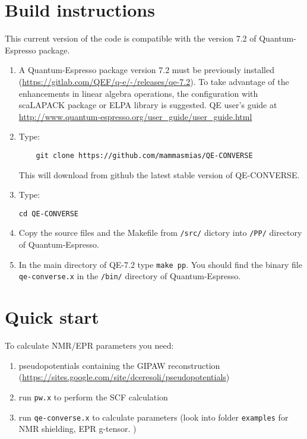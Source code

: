 \documentclass[a4paper,11pt,twoside]{article}
\begin{document}
\section{Build instructions}
This current version of the code is compatible with the version 7.2 of Quantum-Espresso package.
\begin{enumerate}
\item A Quantum-Espresso package version 7.2 must be previously installed (\url{https://gitlab.com/QEF/q-e/-/releases/qe-7.2}). To take advantage of the enhancements in linear algebra operations, the configuration with scaLAPACK package or ELPA library is suggested.
QE user's guide at \url{http://www.quantum-espresso.org/user_guide/user_guide.html}
\item Type:
\begin{verbatim}
    git clone https://github.com/mammasmias/QE-CONVERSE 
\end{verbatim}
This will download from github the latest stable version of QE-CONVERSE.
\item Type:
\begin{verbatim}
cd QE-CONVERSE
\end{verbatim}
\item 
 Copy the source files and the Makefile from \texttt{/src/} dictory into \texttt{/PP/} directory of Quantum-Espresso.
\item
 In the main directory of QE-7.2 type \texttt{make pp}. You should find the binary file \texttt{qe-converse.x} in the \texttt{/bin/} directory of Quantum-Espresso.
\end{enumerate}
\section{Quick start}
To calculate NMR/EPR parameters you need: 
\begin{enumerate}
\item pseudopotentials containing the GIPAW reconstruction (\url{https://sites.google.com/site/dceresoli/pseudopotentials})
\item run \texttt{pw.x} to perform the SCF calculation 
\item run \texttt{qe-converse.x} to calculate parameters (look into folder
\texttt{examples} for NMR shielding, EPR g-tensor.
)
\end{enumerate}
\end{document}
